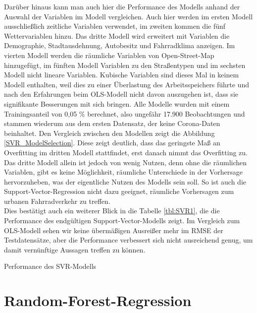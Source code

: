\documentclass[a4paper,12pt]{thesis}
\begin{document}
Darüber hinaus kann man auch hier die Performance des Modells anhand der Auswahl der Variablen im Modell vergleichen. Auch hier werden im ersten Modell ausschließlich zeitliche Variablen verwendet, im zweiten kommen die fünf Wettervariablen hinzu. Das dritte Modell wird erweitert mit Variablen die Demographie, Stadtausdehnung, Autobesitz und Fahrradklima anzeigen. Im vierten Modell werden die räumliche Variablen von Open-Street-Map hinzugefügt, im fünften Modell Variablen zu den Straßentypen und im sechsten Modell nicht lineare Variablen. Kubische Variablen sind dieses Mal in keinem Modell enthalten, weil dies zu einer Überlastung des Arbeitsspeichers führte und nach den Erfahrungen beim OLS-Modell nicht davon auszugehen ist, dass sie signifikante Besserungen mit sich bringen. Alle Modelle wurden mit einem Trainingsanteil von 0,05 \% berechnet, also ungefähr 17.900 Beobachtungen und stammen wiederum aus dem ersten Datensatz, der keine Corona-Daten beinhaltet. Den Vergleich zwischen den Modellen zeigt die Abbildung \ref{SVR_ModelSelection}. Diese zeigt deutlich, dass das geringste Maß an Overfitting im dritten Modell stattfindet, erst danach nimmt das Overfitting zu. Das dritte Modell allein ist jedoch von wenig Nutzen, denn ohne die räumlichen Variablen, gibt es keine Möglichkeit, räumliche Unterschiede in der Vorhersage hervorzuheben, was der eigentliche Nutzen des Modells sein soll. So ist auch die Support-Vector-Regression nicht dazu geeignet, räumliche Vorhersagen zum urbanen Fahrradverkehr zu treffen.\\
Dies bestätigt auch ein weiterer Blick in die Tabelle \ref{tbl:SVR1}, die die Performance des endgültigen Support-Vector-Modells zeigt. Im Vergleich zum OLS-Modell sehen wir keine übermäßigen Ausreißer mehr im RMSE der Testdatensätze, aber die Performance verbessert sich nicht ausreichend genug, um damit vernünftige Aussagen treffen zu können.

\begin{table}
	\caption{Performance des SVR-Modells}
	\label{tbl:SVR1}
\end{table}

\section{Random-Forest-Regression}\label{RF}
\end{document}
